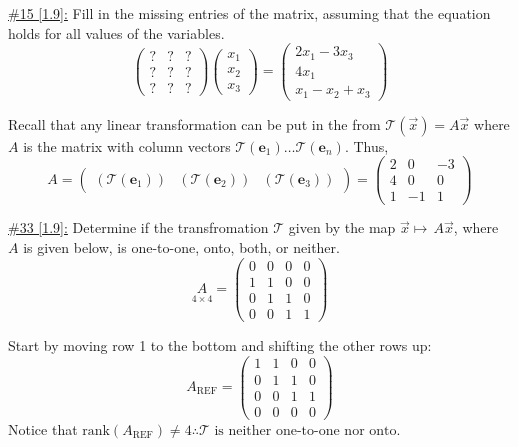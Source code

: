 \documentclass{exam}
\begin{document}
\underline{\#15 [1.9]:} Fill in the missing entries of the matrix, assuming that the equation holds for all values of the variables.
\[
    \begin{pmatrix}
        ? & ? & ? \\
        ? & ? & ? \\
        ? & ? & ? 
    \end{pmatrix}
    \begin{pmatrix}
        x_1 \\ x_2 \\ x_3
    \end{pmatrix}
    = 
    \begin{pmatrix}
        2x_1 - 3x_3 \\
        4x_1 \\
        x_1 - x_2 + x_3
    \end{pmatrix}
\]
\begin{solution}
    Recall that any linear transformation can be put in the from $\mathcal{T}\left(\vec{x}\right) = A\vec{x}$ where $A$ is the matrix with column vectors $\mathcal{T}\left(\textbf{e}_1\right) \dots \mathcal{T}\left(\textbf{e}_n\right)$. Thus, 
    \[
        A = \begin{pmatrix}
            \left(\mathcal{T}\left({\textbf{e}_1}\right)\right) & 
            \left(\mathcal{T}\left({\textbf{e}_2}\right)\right) &
            \left(\mathcal{T}\left({\textbf{e}_3}\right)\right) 
        \end{pmatrix} 
        = 
        \boxed{
            \begin{pmatrix}
                2 & 0 & -3 \\
                4 & 0 & 0 \\
                1 & -1 & 1 
            \end{pmatrix}
        }
    \]
\end{solution}

\underline{\#33 [1.9]:} Determine if the transfromation $\mathcal{T}$ given by the map $\vec{x}\mapsto\,A\vec{x}$, where $A$ is given below, is one-to-one, onto, both, or neither.
\[
    \underset{4 \times 4}{A} = \begin{pmatrix}
        0 & 0 & 0 & 0 \\
        1 & 1 & 0 & 0 \\
        0 & 1 & 1 & 0 \\
        0 & 0 & 1 & 1 
    \end{pmatrix}
\]
\begin{solution}
    Start by moving row 1 to the bottom and shifting the other rows up:
    \[
        A_{\text{REF}} = \begin{pmatrix}
            1 & 1 & 0 & 0 \\
            0 & 1 & 1 & 0 \\
            0 & 0 & 1 & 1 \\
            0 & 0 & 0 & 0 
        \end{pmatrix}
    \]
    Notice that $\text{rank}\left(A_{\text{REF}}\right) \ne 4 \therefore \boxed{\mathcal{T} \text{ is neither one-to-one nor onto.}}$
\end{solution}
\end{document}
